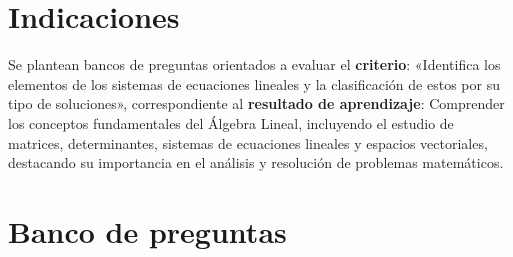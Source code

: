 \documentclass[a4,11pt]{aleph-notas}
\begin{document}
\encabezado

\vspace*{-8mm}
\tableofcontents

\section{Indicaciones}

Se plantean bancos de preguntas orientados a evaluar el \textbf{criterio}: «Identifica los elementos de los sistemas de ecuaciones lineales y la clasificación de estos por su tipo de soluciones», correspondiente al \textbf{resultado de aprendizaje}: Comprender los conceptos fundamentales del Álgebra Lineal, incluyendo el estudio de matrices, determinantes, sistemas de ecuaciones lineales y espacios vectoriales, destacando su importancia en el análisis y resolución de problemas matemáticos.

\section{Banco de preguntas}
\end{document}
